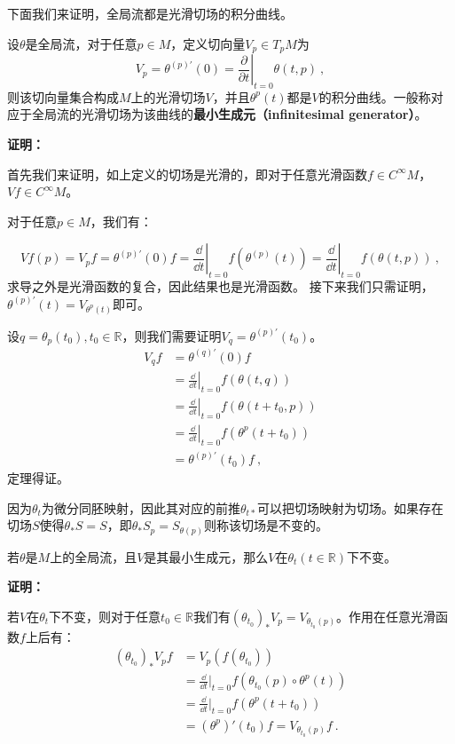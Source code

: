 下面我们来证明，全局流都是光滑切场的积分曲线。
\begin{theorem}{}
设$\theta$是全局流，对于任意$p\in M$，定义切向量$V_p\in T_p M$为
\begin{equation}
V_p=\theta^{(p) \prime}(0)=\left.\frac{\partial}{\partial t}\right|_{t=0} \theta(t, p) ~,
\end{equation}
则该切向量集合构成$M$上的光滑切场$V$，并且$\theta^p(t)$都是$V$的积分曲线。一般称对应于全局流的光滑切场为该曲线的\textbf{最小生成元（infinitesimal
generator）}。
\end{theorem}
\textbf{证明：}

首先我们来证明，如上定义的切场是光滑的，即对于任意光滑函数$f\in C^{\infty}M$，$Vf\in C^{\infty}M$。

对于任意$p\in M$，我们有：

\begin{equation}
Vf(p)=V_pf=\theta^{(p)\prime}(0)f=\left.\frac{\dd}{\dd t}\right|_{t=0} f\left(\theta^{(p)}(t)\right)=\left.\frac{\dd}{\dd t}\right|_{t=0} f(\theta(t, p)) ~,
\end{equation}
求导之外是光滑函数的复合，因此结果也是光滑函数。
接下来我们只需证明，$\theta^{(p) \prime}(t)=V_{\theta^{p}(t)}$即可。

设$q=\theta_p(t_0),t_0\in \mathbb R$，则我们需要证明$V_q=\theta^{(p)\prime}(t_0)$。
\begin{equation}
\begin{aligned}
V_qf&=\theta^{(q)\prime}(0)f\\
&=\left.\frac{\dd}{\dd t}\right|_{t=0} f(\theta(t, q))\\
&=\left.\frac{\dd}{\dd t}\right|_{t=0} f(\theta(t+t_0, p))\\
&=\left.\frac{\dd}{\dd t}\right|_{t=0} f(\theta^p(t+t_0))\\
&=\theta^{(p)\prime}(t_0)f~,
\end{aligned}
\end{equation}
定理得证。

因为$\theta_t$为微分同胚映射，因此其对应的前推$\theta_{t*}$可以把切场映射为切场。如果存在切场$S$使得$\theta_*S=S$，即$\theta_*S_p=S_{\theta(p)}
$则称该切场是不变的。

\begin{theorem}{}
若$\theta$是$M$上的全局流，且$V$是其最小生成元，那么$V$在$\theta_t(t\in \mathbb R)$下不变。
\end{theorem}
\textbf{证明：}

若$V$在$\theta_t$下不变，则对于任意$t_0\in\mathbb R$我们有$(\theta_{t_0})_*V_p=V_{\theta_{t_0}(p)}$。作用在任意光滑函数$f$上后有：
\begin{equation}
\begin{aligned}
(\theta_{t_0})_*V_pf&=V_p(f(\theta_{t_0}))\\
&=\frac{\dd}{\dd t}|_{t=0}f(\theta_{t_0}(p)\circ\theta^p(t))\\
&=\frac{\dd}{\dd t}|_{t=0}f(\theta^p(t+t_0))\\
&=(\theta^p)'(t_0)f=V_{\theta_{t_0}(p)}f~.
\end{aligned}
\end{equation}

